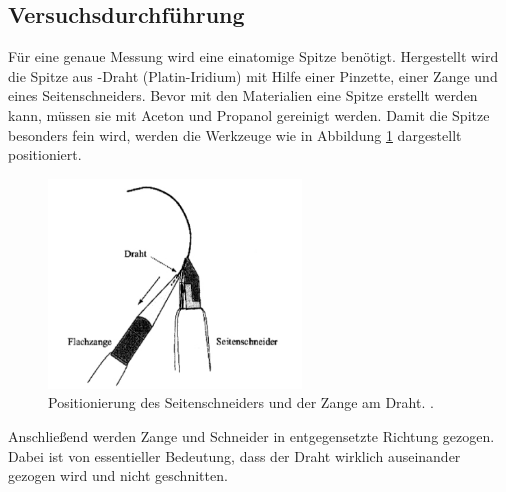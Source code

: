 \subsection{Versuchsdurchführung}

Für eine genaue Messung wird eine einatomige Spitze benötigt.
Hergestellt wird die Spitze aus -Draht (Platin-Iridium)
mit Hilfe einer Pinzette, einer Zange und eines Seitenschneiders.
Bevor mit den Materialien eine Spitze erstellt werden kann, müssen sie mit Aceton und Propanol gereinigt werden. %
Damit die Spitze besonders fein wird, werden die Werkzeuge wie in Abbildung \ref{fig: zange_schneider}
dargestellt positioniert.
\begin{figure}[!h]
  \centering
  \includegraphics[width=0.6\textwidth]{./pics/herstellung_spitze.png}
  \caption{Positionierung des Seitenschneiders und der Zange am Draht. \cite{anleitung_frankfurt}.}
  \label{fig: zange_schneider}
\end{figure}
Anschließend werden Zange und Schneider in entgegensetzte Richtung gezogen.
Dabei ist von essentieller Bedeutung, dass der Draht wirklich auseinander gezogen wird und
nicht geschnitten.

